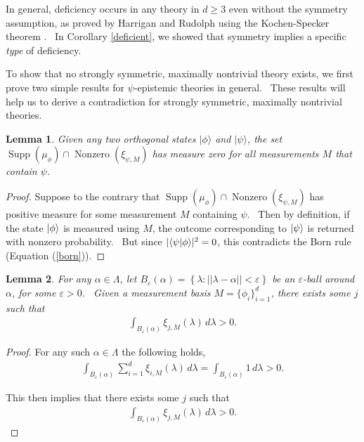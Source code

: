 \documentclass[letterpaper,11pt]{article}
\newtheorem{lem}{Lemma}
\newcommand{\ban}{\begin{eqnarray*}}
\newcommand{\ean}{\end{eqnarray*}}
\newcommand{\braket}[2]{\mbox{$ \langle #1 | #2 \rangle $}}
\newcommand{\ket}[1]{\mbox{$ | #1 \rangle $}}
\DeclareMathOperator{\supp}{Supp}
\DeclareMathOperator{\nz}{Nonzero}
\begin{document}
In general, deficiency occurs in any theory in $d\geq 3$ even without the
symmetry assumption, as proved by Harrigan and Rudolph \cite{hr} using the
Kochen-Specker theorem \cite{ks}. \ In Corollary \ref{deficient}, we showed
that symmetry implies a specific \emph{type} of deficiency.


To show that no strongly symmetric, maximally nontrivial theory exists, we first prove two simple
results for $\psi$-epistemic theories in general. \ These results will help us to derive a contradiction
for strongly symmetric, maximally nontrivial theories.

\begin{lem}
\label{orthogonal} Given any two orthogonal states $ | \phi \rangle $ and $%
 | \psi \rangle $, the set $\supp(\mu_{\phi})\cap \nz(\xi_{\psi,M})$ has
measure zero for all measurements $M$ that contain $\psi$.
\end{lem}

\begin{proof}
Suppose to the contrary that $\supp(\mu_{\phi})\cap \nz(\xi_{\psi,M})$ has positive measure for some measurement $M$ containing $\psi$. \ Then by definition, if the state $\ket{\phi}$ is measured using $M$, the outcome corresponding to $\ket{\psi}$ is returned with nonzero probability. \ But since $|\braket{\psi}{\phi}|^2=0$, this contradicts the Born rule (Equation (\ref{born})).
\end{proof}


\begin{lem}
\label{response} For any $\alpha\in\Lambda$, let $B_{\varepsilon}(\alpha)=\left%
\{\lambda:||\lambda-\alpha||<\varepsilon\right\}$ be an $\varepsilon$-ball around $
\alpha$, for some $\varepsilon>0$. \ Given a measurement basis $%
M=\{\phi_i\}_{i=1}^d$, there exists some $j$ such that
\begin{eqnarray}
\int_{B_\varepsilon(\alpha)} \xi_{j,M}(\lambda) \,d\lambda >0.
\end{eqnarray}
\end{lem}

\begin{proof}
For any such $\alpha\in\Lambda$ the following holds,
\ban \int_{B_\varepsilon(\alpha)} \sum_{i=1}^{d} \xi_{i,M}(\lambda)\,d\lambda =\int_{B_\varepsilon(\alpha)} 1\,d\lambda >0. \ean

\noindent This then implies that there exists some $j$ such that
\ban \int_{B_\varepsilon(\alpha)} \xi_{j,M}(\lambda) \,d\lambda >0. \ean
\end{proof}
\end{document}
